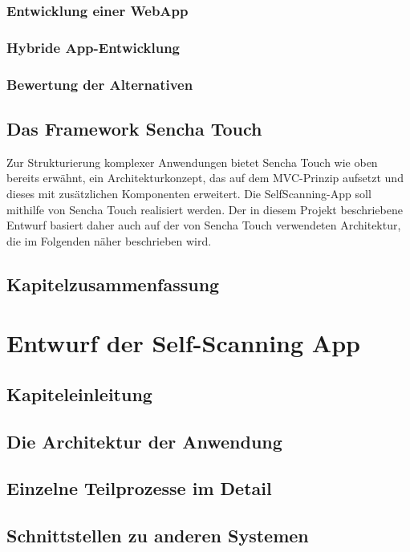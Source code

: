 \subsection{Entwicklung einer WebApp}
\subsection{Hybride App-Entwicklung}
\subsection{Bewertung der Alternativen}

\section{Das Framework Sencha Touch}

Zur Strukturierung komplexer Anwendungen bietet Sencha Touch wie oben bereits erwähnt, ein Architekturkonzept, das auf dem MVC-Prinzip aufsetzt und dieses mit zusätzlichen Komponenten erweitert. Die SelfScanning-App soll mithilfe von Sencha Touch realisiert werden. Der in diesem Projekt beschriebene Entwurf basiert daher auch auf der von Sencha Touch verwendeten Architektur, die im Folgenden näher beschrieben wird.

\section{Kapitelzusammenfassung}

\chapter{Entwurf der Self-Scanning App}
\section{Kapiteleinleitung}
\section{Die Architektur der Anwendung}
\section{Einzelne Teilprozesse im Detail}
\section{Schnittstellen zu anderen Systemen}
